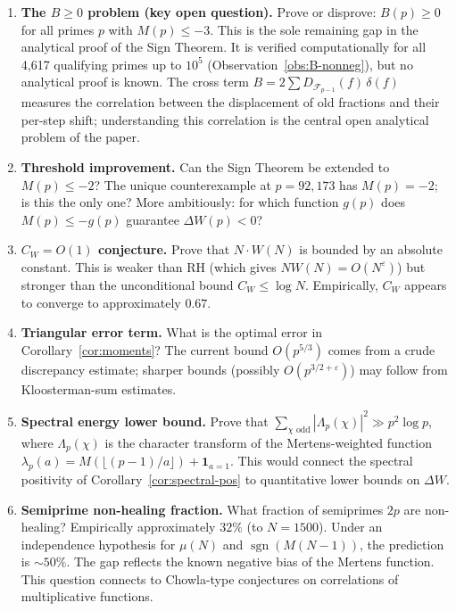 \documentclass[11pt]{article}
\theoremstyle{definition}
\newcommand{\F}{\mathcal{F}}
\begin{document}
\begin{enumerate}
  \item \textbf{The $B \ge 0$ problem (key open question).}
    Prove or disprove: $B(p) \ge 0$ for all primes $p$ with
    $M(p) \le -3$.  This is the sole remaining gap in the
    analytical proof of the Sign Theorem.  It is verified
    computationally for all 4,617 qualifying primes up to $10^5$
    (Observation~\ref{obs:B-nonneg}), but no analytical proof is
    known.  The cross term $B = 2\sum D_{\F_{p-1}}(f)\,\delta(f)$
    measures the correlation between the displacement of old
    fractions and their per-step shift; understanding this
    correlation is the central open analytical problem of the
    paper.

  \item \textbf{Threshold improvement.}
    Can the Sign Theorem be extended to $M(p) \le -2$?
    The unique counterexample at $p = 92{,}173$ has $M(p) = -2$;
    is this the only one?  More ambitiously: for which function
    $g(p)$ does $M(p) \le -g(p)$ guarantee $\Delta W(p) < 0$?

  \item \textbf{$C_W = O(1)$ conjecture.}
    Prove that $N \cdot W(N)$ is bounded by an absolute constant.
    This is weaker than RH (which gives $N W(N) = O(N^{\varepsilon})$)
    but stronger than the unconditional bound $C_W \le \log N$.
    Empirically, $C_W$ appears to converge to approximately $0.67$.

  \item \textbf{Triangular error term.}
    What is the optimal error in Corollary~\ref{cor:moments}?
    The current bound $O(p^{5/3})$ comes from a crude discrepancy
    estimate; sharper bounds (possibly $O(p^{3/2+\varepsilon})$)
    may follow from Kloosterman-sum estimates.

  \item \textbf{Spectral energy lower bound.}
    Prove that $\sum_{\chi \text{ odd}} |\Lambda_p(\chi)|^2
    \gg p^2 \log p$, where $\Lambda_p(\chi)$ is the character
    transform of the Mertens-weighted function
    $\lambda_p(a) = M(\lfloor (p-1)/a \rfloor) + \mathbf{1}_{a=1}$.
    This would connect the spectral positivity of
    Corollary~\ref{cor:spectral-pos} to quantitative lower bounds
    on $\Delta W$.

  \item \textbf{Semiprime non-healing fraction.}
    What fraction of semiprimes $2p$ are non-healing?
    Empirically approximately $32\%$ (to $N = 1500$).  Under
    an independence hypothesis for $\mu(N)$ and
    $\operatorname{sgn}(M(N-1))$, the prediction is $\sim 50\%$.
    The gap reflects the known negative bias of the Mertens
    function.  This question connects to Chowla-type conjectures
    on correlations of multiplicative functions.


\end{enumerate}
\end{document}
